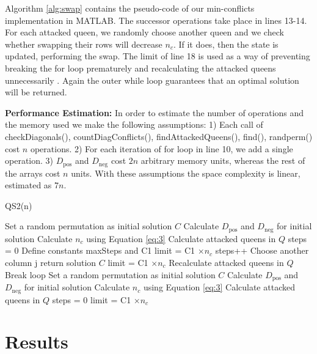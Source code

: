 Algorithm \ref{alg:swap} contains the pseudo-code of our min-conflicts implementation in MATLAB. The successor operations take place in lines 13-14. For each attacked queen, we randomly choose another queen and we check whether swapping their rows will decrease $n_c$. If it does, then the state is updated, performing the swap. The limit of line 18 is used as a way of preventing breaking the for loop prematurely and recalculating the attacked queens unnecessarily \citep{sosic91}. Again the outer while loop guarantees that an optimal solution will be returned.

\textbf{Performance Estimation:} In order to estimate the number of operations and the memory used we make the following assumptions: 1) Each call of checkDiagonals(), countDiagConflicts(), findAttackedQueens(), find(), randperm() cost $n$ operations. 2) For each iteration of for loop in line 10, we add a single operation. 3) $D_{\text{pos}}$ and $D_{\text{neg}}$ cost $2n$ arbitrary memory units, whereas the rest of the arrays cost $n$ units. With these assumptions the space complexity is linear,  estimated as $7n$.

\begin{algorithm}
\caption{QS2(n)}\label{alg:swap}
\begin{algorithmic}[1]
\State Set a random permutation as initial solution $C$
\State Calculate $D_{\text{pos}}$ and $D_{\text{neg}}$ for initial solution
\State Calculate $n_c$ using Equation \ref{eq:3}
\State Calculate attacked queens in $Q$
\State steps = 0
\State Define constants maxSteps and C1
\State limit = C1 $\times n_c$ 
\State steps++
\State Choose another column j
\State return solution $C$
\Else
{}
\State limit = C1 $\times n_c$ 
\State Recalculate attacked queens in $Q$
\State Break loop
\EndIf
\EndIf
\EndIf
\EndFor
\EndWhile
\State Set a random permutation as initial solution $C$
\State Calculate $D_{\text{pos}}$ and $D_{\text{neg}}$ for initial solution
\State Calculate $n_c$ using Equation \ref{eq:3}
\State Calculate attacked queens in $Q$
\State steps = 0
\State limit = C1 $\times n_c$ 
\EndWhile
\end{algorithmic}
\end{algorithm}

\section{Results}

